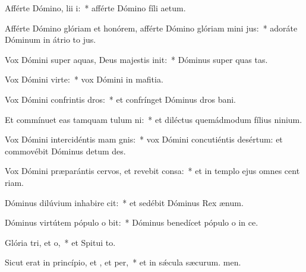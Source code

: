 \item Afférte Dómino, lii i:~* afférte Dómino fíli aetum.
\item Afférte Dómino glóriam et honórem, afférte Dómino glóriam mini jus:~* adoráte Dóminum in átrio to jus.
\item Vox Dómini super aquas, Deus majestis init:~* Dóminus super quas tas.
\item Vox Dómini  virte:~* vox Dómini in mafitia.
\item Vox Dómini confrintis dros:~* et confrínget Dóminus dros bani.
\item Et commínuet eas tamquam tulum ni:~* et diléctus quemádmodum fílius ninium.
\item Vox Dómini intercidéntis mam gnis:~* vox Dómini concutiéntis desértum: et commovébit Dóminus detum des.
\item Vox Dómini præparántis cervos, et revebit consa:~* et in templo ejus omnes cent riam.
\item Dóminus dilúvium inhabire cit:~* et sedébit Dóminus Rex  ænum.
\item Dóminus virtútem pópulo o bit:~* Dóminus benedícet pópulo o in ce.
\item Glória tri, et o,~* et Spitui to.
\item Sicut erat in princípio, et , et per,~* et in sǽcula sæcurum. men.
